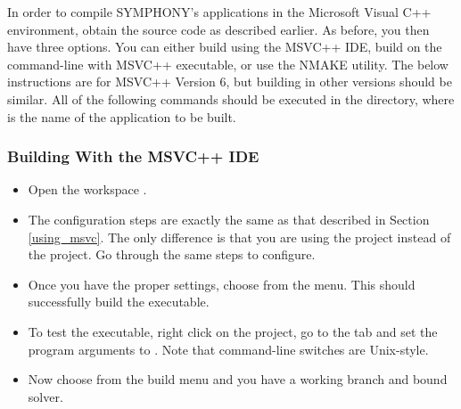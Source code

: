In order to compile SYMPHONY's applications in the Microsoft Visual C++
environment, obtain the source code as described earlier. As before, you then
have three options. You can either build using the MSVC++ IDE, build on the
command-line with MSVC++ executable, or use the NMAKE utility. The below
instructions are for MSVC++ Version 6, but building in other versions should
be similar. All of the following commands should be executed in the
 directory, where
 is the name of the application to be built.

\subsubsection{Building With the MSVC++ IDE}

\begin{itemize}

\item Open the workspace .

\item The configuration steps are exactly the same as that described in
  Section \ref{using_msvc}. The only difference is that you are using the
   project instead of the  project. Go through the
  same steps to configure.

\item Once you have the proper settings, choose  from the  menu. This should successfully 
build the executable.

\item
To test the executable, right click on the  project, go to the
 tab and set the program arguments to 
. Note that command-line switches are 
Unix-style.

\item
Now choose  from the build menu and you have a working branch
and bound solver. 

\end{itemize}

